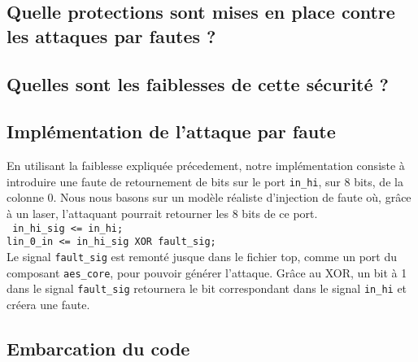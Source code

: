 \subsection{Quelle protections sont mises en place contre les attaques par
fautes ?}

\subsection{Quelles sont les faiblesses de cette sécurité ?}

\subsection{Implémentation de l'attaque par faute}

En utilisant la faiblesse expliquée précedement, notre implémentation
consiste à introduire une faute de retournement de bits sur le port
\texttt{in_hi}, sur 8 bits, de la colonne 0. Nous nous basons sur un
modèle réaliste d'injection de faute où, grâce à un laser, l'attaquant
pourrait retourner les 8 bits de ce port.\\
\texttt{
  in_hi_sig <= in_hi; \\
  lin_0_in <= in_hi_sig XOR fault_sig;
} \\
Le signal \texttt{fault_sig} est remonté jusque dans le fichier top, comme un
port du composant \texttt{aes_core}, pour pouvoir générer l'attaque.
Grâce au XOR,
un bit à 1 dans le signal \texttt{fault_sig} retournera le bit correspondant
dans le signal \texttt{in_hi} et créera une faute.


\subsection{Embarcation du code}


